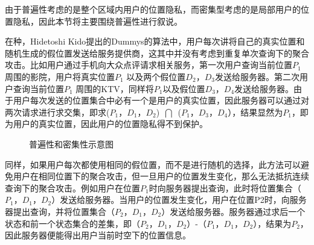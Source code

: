由于普遍性考虑的是整个区域内用户的位置隐私，而密集型考虑的是局部用户的位置隐私，因此本节将主要围绕普遍性进行叙说。

在\cite{Dummies}种，Hidetoshi Kido提出的Dummys的算法中，用户每次讲将自己的真实位置和随机生成的假位置发送给服务提供商，这其中并没有考虑到重复单次查询下的聚合攻击。比如用户通过手机向大众点评请求相关服务，第一次用户查询当前位置$P_1$周围的影院，用户将真实位置$P_1$ 以及两个假位置$D_2$，$D_3$发送给服务器。第二次用户查询当前位置$P_1$ 周围的KTV，同样将$P_1$以及假位置$D_3$，$D_4$发送给服务器。由于用户每次发送的位置集合中必有一个是用户的真实位置，因此服务器可以通过对两次请求进行求交集，即求($P_1$，$D_1$，$D_2$)~$\bigcap$~($P_1$，$D_3$，$D_4$），结果显然为$P_1$，即为用户的真实位置，因此用户的位置隐私得不到保护。

\begin{figure}
 \centering
 \hspace{1in}
 \caption{普遍性和密集性示意图} \label{fig:subfig} %
\end{figure}
同样，如果用户每次都使用相同的假位置，而不是进行随机的选择，此方法可以避免用户在相同位置下的聚合攻击，但一旦用户的位置发生变化，那么无法抵抗连续查询下的聚合攻击。例如用户在位置$P_1$时向服务器提出查询，此时将位置集合（$P_1$，$D_1$，$D_2$）发送给服务器。当用户的位置发生变化，用户在位置P2时，向服务器提出查询，并将位置集合（$P_2$，$D_1$，$D_2$）发送给服务器。服务器通过求后一个状态和前一个状态集合的差集，即（$P_2$，$D_1$，$D_2$）-（$P_1$，$D_1$，$D_2$），结果为$P_2$，因此服务器便能得出用户当前时空下的位置信息。

